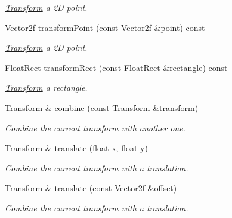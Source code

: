 \begin{DoxyCompactItemize}
\begin{DoxyCompactList}\small\item\em \mbox{\hyperlink{classsf_1_1_transform}{Transform}} a 2D point. \end{DoxyCompactList}\item 
\mbox{\hyperlink{classsf_1_1_vector2}{Vector2f}} \mbox{\hyperlink{classsf_1_1_transform_ab42a0bb7a252c6d221004f6372ce5fdc}{transform\+Point}} (const \mbox{\hyperlink{classsf_1_1_vector2}{Vector2f}} \&point) const
\begin{DoxyCompactList}\small\item\em \mbox{\hyperlink{classsf_1_1_transform}{Transform}} a 2D point. \end{DoxyCompactList}\item 
\mbox{\hyperlink{classsf_1_1_rect}{Float\+Rect}} \mbox{\hyperlink{classsf_1_1_transform_a3824a20505d81a94bc22be1ffee57d3d}{transform\+Rect}} (const \mbox{\hyperlink{classsf_1_1_rect}{Float\+Rect}} \&rectangle) const
\begin{DoxyCompactList}\small\item\em \mbox{\hyperlink{classsf_1_1_transform}{Transform}} a rectangle. \end{DoxyCompactList}\item 
\mbox{\hyperlink{classsf_1_1_transform}{Transform}} \& \mbox{\hyperlink{classsf_1_1_transform_acd978f60421a0f839bb9a8263e8877ff}{combine}} (const \mbox{\hyperlink{classsf_1_1_transform}{Transform}} \&transform)
\begin{DoxyCompactList}\small\item\em Combine the current transform with another one. \end{DoxyCompactList}\item 
\mbox{\hyperlink{classsf_1_1_transform}{Transform}} \& \mbox{\hyperlink{classsf_1_1_transform_ab54f6c8070cc05e2afcb3145fbf4395a}{translate}} (float x, float y)
\begin{DoxyCompactList}\small\item\em Combine the current transform with a translation. \end{DoxyCompactList}\item 
\mbox{\hyperlink{classsf_1_1_transform}{Transform}} \& \mbox{\hyperlink{classsf_1_1_transform_a452ff6e32d5120fa8c132c1bf0ad83cd}{translate}} (const \mbox{\hyperlink{classsf_1_1_vector2}{Vector2f}} \&offset)
\begin{DoxyCompactList}\small\item\em Combine the current transform with a translation. \end{DoxyCompactList}\item 

\end{DoxyCompactItemize}
